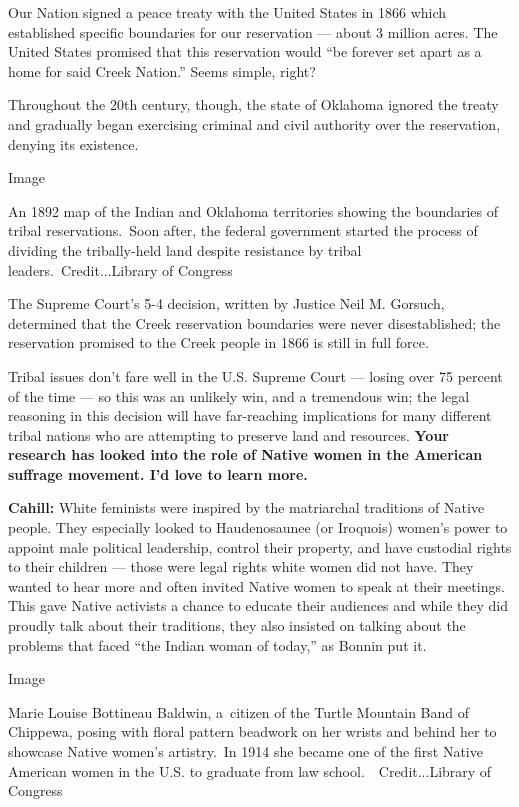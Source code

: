 Our Nation signed a peace treaty with the United States in 1866 which
established specific boundaries for our reservation --- about 3 million
acres. The United States promised that this reservation would ``be
forever set apart as a home for said Creek Nation.'' Seems simple,
right?

Throughout the 20th century, though, the state of Oklahoma ignored the
treaty and gradually began exercising criminal and civil authority over
the reservation, denying its existence.

Image

An 1892 map of the Indian and Oklahoma territories showing the
boundaries of tribal reservations.~Soon after, the federal government
started the process of dividing the tribally-held land despite
resistance by tribal leaders.~Credit...Library of Congress

The Supreme Court's 5-4 decision, written by Justice Neil M. Gorsuch,
determined that the Creek reservation boundaries were never
disestablished; the reservation promised to the Creek people in 1866 is
still in full force.

Tribal issues don't fare well in the U.S. Supreme Court --- losing over
75 percent of the time --- so this was an unlikely win, and a tremendous
win; the legal reasoning in this decision will have far-reaching
implications for many different tribal nations who are attempting to
preserve land and resources. \textbf{Your research has looked into the
role of Native women in the American suffrage movement. I'd love to
learn more.}

\textbf{Cahill:} White feminists were inspired by the matriarchal
traditions of Native people. They especially looked to Haudenosaunee (or
Iroquois) women's power to appoint male political leadership, control
their property, and have custodial rights to their children --- those
were legal rights white women did not have. They wanted to hear more and
often invited Native women to speak at their meetings. This gave Native
activists a chance to educate their audiences and while they did proudly
talk about their traditions, they also insisted on talking about the
problems that faced ``the Indian woman of today,'' as Bonnin put it.

Image

Marie Louise Bottineau Baldwin, a~citizen of the Turtle Mountain Band of
Chippewa, posing with floral pattern beadwork on her wrists and behind
her to showcase Native women's artistry.~In 1914 she became one of the
first Native American women in the U.S. to graduate from law
school.~~Credit...Library of Congress

